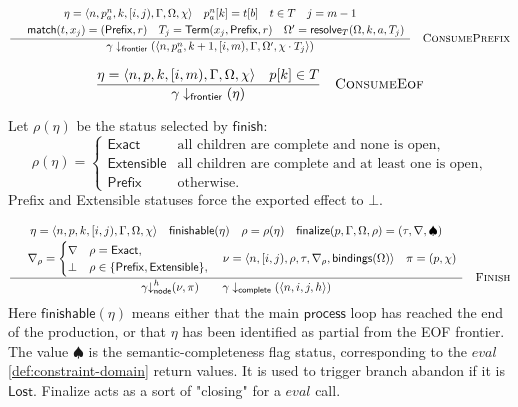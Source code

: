 \[
\frac{
\begin{array}{c}
  \eta=\langle n,p^n_a,k,[i,j),\Gamma,\Omega,\chi\rangle
  \quad
  p^n_a[k]=t[b]
  \quad
  t\in T
  \quad
  j=m-1 \\[0.25em]
  \quad
  \mathsf{match}(t,x_j)=(\mathsf{Prefix},r)
  \quad
  T_j=\mathsf{Term}(x_j,\mathsf{Prefix},r)
  \quad
  \Omega'=\mathsf{resolve}_T(\Omega,k,a,T_j)
\end{array}
}{
  \gamma \downarrow_{\mathsf{frontier}}
  (\langle n,p^n_a,k+1,[i,m),\Gamma,\Omega',\chi\cdot T_j\rangle)
}
\quad\textsc{ConsumePrefix}
\]

\[
\frac{
  \eta=\langle n,p,k,[i,m),\Gamma,\Omega,\chi\rangle
  \quad
  p[k]\in T
}{
  \gamma \downarrow_{\mathsf{frontier}}(\eta)
}
\quad\textsc{ConsumeEof}
\]

Let $\rho(\eta)$ be the status selected by $\mathsf{finish}$:
\[
\rho(\eta)=
\begin{cases}
\mathsf{Exact} & \text{all children are complete and none is open},\\
\mathsf{Extensible} & \text{all children are complete and at least one is open},\\
\mathsf{Prefix} & \text{otherwise}.
\end{cases}
\]
Prefix and Extensible statuses force the exported effect to $\bot$.

\[
\frac{
  \begin{array}{cc}
  \eta=\langle n,p,k,[i,j),\Gamma,\Omega,\chi\rangle
  \quad
  \mathsf{finishable}(\eta)
  \quad
  \rho=\rho(\eta)
  \quad
  \mathsf{finalize}(p,\Gamma,\Omega,\rho)=(\tau,\nabla,\spadesuit) \\[0.25em]
  \quad
  \nabla_\rho=
  \begin{cases}
    \nabla & \rho=\mathsf{Exact},\\
    \bot & \rho\in\{\mathsf{Prefix},\mathsf{Extensible}\},
  \end{cases} 
  \quad
  \nu=\langle n,[i,j),\rho,\tau,\nabla_\rho,\mathsf{bindings}(\Omega)\rangle
  \quad
  \pi=(p,\chi)
  \end{array}
}{
  \gamma {\downarrow}^h_{\mathsf{node}}(\nu,\pi)
  \qquad
  \gamma \downarrow_{\mathsf{complete}}(\langle n,i,j,h\rangle)
}
\quad\textsc{Finish}
\]
Here $\mathsf{finishable}(\eta)$ means either that the main $\mathsf{process}$ loop has reached the end of the production, or that $\eta$ has been identified as partial from the EOF frontier. The value $\spadesuit$ is the semantic-completeness flag status, corresponding to the $\mathit{eval}$ \ref{def:constraint-domain} return values. It is used to trigger branch abandon if it is $\mathsf{Lost}$. Finalize acts as a sort of "closing" for a  $\mathit{eval}$ call.

